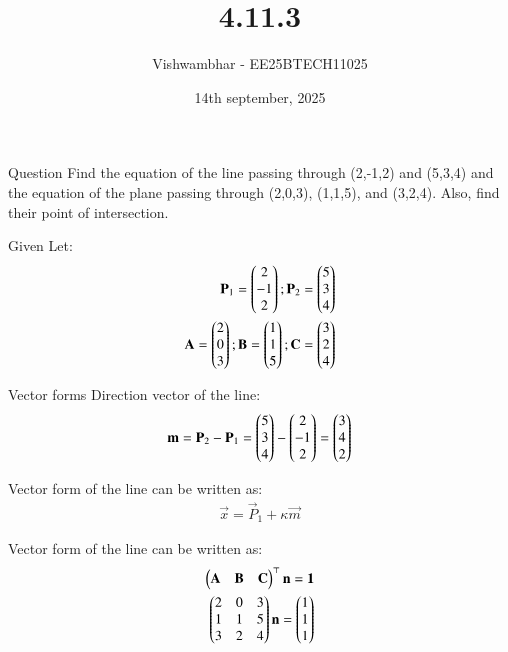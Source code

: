 \documentclass{beamer}
\title{4.11.3}
\date{14th september, 2025}
\author{Vishwambhar - EE25BTECH11025}
\begin{document}
\frame{\titlepage}
\begin{frame}{Question}
Find the equation of the line passing through (2,-1,2) and (5,3,4) and the equation of the plane passing through (2,0,3), (1,1,5), and (3,2,4). Also, find their point of intersection.
\end{frame}

\begin{frame}{Given}
Let:
\begin{align}
    \mathbf{P}_1=\begin{pmatrix}2\\-1\\2\end{pmatrix};
    \mathbf{P}_2=\begin{pmatrix}5\\3\\4\end{pmatrix}\\
    \mathbf{A}=\begin{pmatrix}2\\0\\3\end{pmatrix};\mathbf{B}=\begin{pmatrix}1\\1\\5\end{pmatrix};\mathbf{C}=\begin{pmatrix}3\\2\\4\end{pmatrix}    
\end{align}
\end{frame}

\begin{frame}{Vector forms}
Direction vector of the line:
\begin{align}
    \mathbf{m}=\mathbf{P}_2-\mathbf{P}_1=\begin{pmatrix}5\\3\\4\end{pmatrix}-\begin{pmatrix}2\\-1\\2\end{pmatrix}=\begin{pmatrix}3\\4\\2\end{pmatrix}
\end{align}

Vector form of the line can be written as:
\begin{align}
    \vec{x}=\vec{P}_1+\kappa\vec{m}
\end{align}

Vector form of the line can be written as:
\begin{align}
    \begin{pmatrix}\mathbf{A}&\mathbf{B}&\mathbf{C}\end{pmatrix}^\top\mathbf{n}=\mathbf{1}\\
    \begin{pmatrix}2&0&3\\1&1&5\\3&2&4\end{pmatrix}\mathbf{n}=\begin{pmatrix}1\\1\\1\end{pmatrix}
\end{align}
\end{frame}
\end{document}
